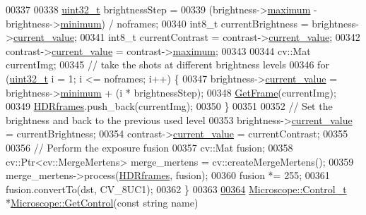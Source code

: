\begin{DoxyCode}
00337 
00338   \hyperlink{_soil_math_types_8h_a435d1572bf3f880d55459d9805097f62}{uint32\_t} brightnessStep =
00339       (brightness->\hyperlink{struct_hardware_1_1_microscope_1_1_control__t_ac9b27cf29b495f9539931166cc3b41e2}{maximum} - brightness->\hyperlink{struct_hardware_1_1_microscope_1_1_control__t_a3695825b54ec92981f3d9f7f5a6c6cac}{minimum}) / noframes;
00340   int8\_t currentBrightness = brightness->\hyperlink{struct_hardware_1_1_microscope_1_1_control__t_ac86486f4807d9c9e7fe75d1983b057d3}{current\_value};
00341   int8\_t currentContrast = contrast->\hyperlink{struct_hardware_1_1_microscope_1_1_control__t_ac86486f4807d9c9e7fe75d1983b057d3}{current\_value};
00342   contrast->\hyperlink{struct_hardware_1_1_microscope_1_1_control__t_ac86486f4807d9c9e7fe75d1983b057d3}{current\_value} = contrast->\hyperlink{struct_hardware_1_1_microscope_1_1_control__t_ac9b27cf29b495f9539931166cc3b41e2}{maximum};
00343 
00344   cv::Mat currentImg;
00345   \textcolor{comment}{// take the shots at different brightness levels}
00346   \textcolor{keywordflow}{for} (\hyperlink{_soil_math_types_8h_a435d1572bf3f880d55459d9805097f62}{uint32\_t} i = 1; i <= noframes; i++) \{
00347     brightness->\hyperlink{struct_hardware_1_1_microscope_1_1_control__t_ac86486f4807d9c9e7fe75d1983b057d3}{current\_value} = brightness->\hyperlink{struct_hardware_1_1_microscope_1_1_control__t_a3695825b54ec92981f3d9f7f5a6c6cac}{minimum} + (i * brightnessStep);
00348     \hyperlink{class_hardware_1_1_microscope_a1ec5c792320ae4db3f3b39830e74f880}{GetFrame}(currentImg);
00349     \hyperlink{class_hardware_1_1_microscope_a2c73db8010320428db3fd41d840dd0eb}{HDRframes}.push\_back(currentImg);
00350   \}
00351 
00352   \textcolor{comment}{// Set the brightness and back to the previous used level}
00353   brightness->\hyperlink{struct_hardware_1_1_microscope_1_1_control__t_ac86486f4807d9c9e7fe75d1983b057d3}{current\_value} = currentBrightness;
00354   contrast->\hyperlink{struct_hardware_1_1_microscope_1_1_control__t_ac86486f4807d9c9e7fe75d1983b057d3}{current\_value} = currentContrast;
00355 
00356   \textcolor{comment}{// Perform the exposure fusion}
00357   cv::Mat fusion;
00358   cv::Ptr<cv::MergeMertens> merge\_mertens = cv::createMergeMertens();
00359   merge\_mertens->process(\hyperlink{class_hardware_1_1_microscope_a2c73db8010320428db3fd41d840dd0eb}{HDRframes}, fusion);
00360   fusion *= 255;
00361   fusion.convertTo(dst, CV\_8UC1);
00362 \}
00363 
\hypertarget{_microscope_8cpp_source_l00364}{}\hyperlink{class_hardware_1_1_microscope_abc794f35d5b68458634507bf7e90e501}{00364} \hyperlink{struct_hardware_1_1_microscope_1_1_control__t}{Microscope::Control\_t} *\hyperlink{class_hardware_1_1_microscope_abc794f35d5b68458634507bf7e90e501}{Microscope::GetControl}(\textcolor{keyword}{const} \textcolor{keywordtype}{string} name)

\end{DoxyCode}
